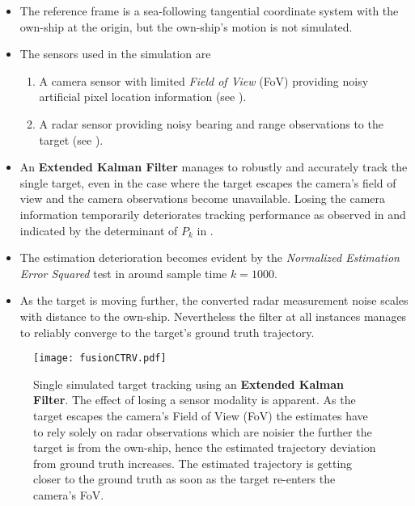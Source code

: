 \begin{itemize}[nosep]%
	\item The reference frame is a sea-following tangential coordinate system with the own-ship at the origin, but the own-ship's motion is not simulated.
	\item  The sensors used in the simulation are 
	\begin{enumerate}[nosep]
		\item A camera sensor with limited \emph{Field of View} (FoV) providing noisy artificial pixel location information (see ).
		\item A radar sensor providing noisy bearing and range observations to the target (see ).
	\end{enumerate}
	\item  An \textbf{Extended Kalman Filter} manages to robustly and accurately track the single target, even in the case where the target escapes the camera's field of view and the camera observations become unavailable. Losing the camera information temporarily deteriorates tracking performance as observed in  and indicated by the determinant of $P_k$ in .
	\item The estimation deterioration becomes evident by the \emph{Normalized Estimation Error Squared} test in  around sample time $k=1000$.
	\item As the target is moving further, the converted radar measurement noise scales with distance to the own-ship. Nevertheless the filter at all instances manages to reliably converge to the target's ground truth trajectory.
\end{itemize}

\begin{figure}[H]
	\centering
	\texttt{[image: fusionCTRV.pdf]}
	\caption{Single simulated target tracking using an \textbf{Extended Kalman Filter}. The effect of losing a sensor modality is apparent. As the target escapes the camera's Field of View (FoV) the estimates have to rely solely on radar observations which are noisier the further the target is from the own-ship, hence the estimated trajectory deviation from ground truth increases. The estimated trajectory is getting closer to the ground truth as soon as the target re-enters the camera's FoV.}
	\label{fig:fusionCTRVescape}
\end{figure}

